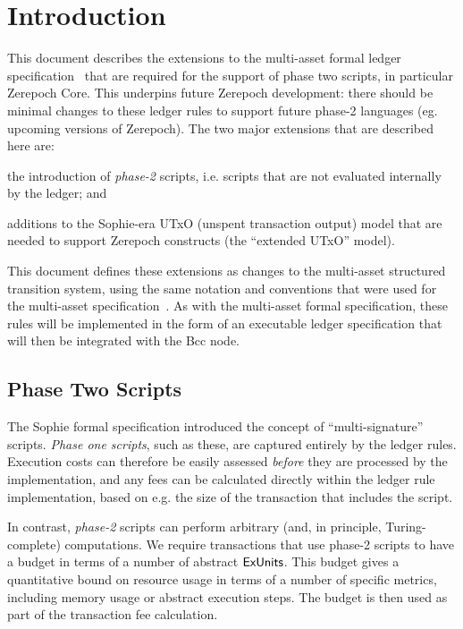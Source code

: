 \section{Introduction}

This document describes the extensions to the multi-asset formal ledger specification~\cite{sophie_ma_spec} that are
required for the support of phase two scripts, in particular Zerepoch Core. This underpins future Zerepoch development: there should be minimal changes to these ledger rules to support future phase-2 languages (eg. upcoming versions of Zerepoch).
%
The two major extensions that are described here are:

\begin{inparaenum}
\item
the introduction
of \emph{phase-2} scripts, i.e. scripts that are not evaluated internally by the ledger; and
\item
  additions to the Sophie-era UTxO (unspent transaction output) model that are needed to support Zerepoch
  constructs (the ``extended UTxO'' model).
\end{inparaenum}

This document defines these extensions as changes to the multi-asset structured transition system,
using the same notation and conventions that were used for the multi-asset specification~\cite{sophie_ma_spec}.
As with the multi-asset formal specification, these rules will be implemented in the form of an executable ledger specification that will then be
integrated with the Bcc node.

\subsection{Phase Two Scripts}

The Sophie formal specification introduced the concept of ``multi-signature'' scripts.
\emph{Phase one scripts}, such as these, are captured entirely by the ledger rules.
Execution costs can therefore be easily assessed \emph{before} they are processed by the implementation,
and any fees can be calculated directly within the ledger rule implementation,
based on e.g. the size of the transaction that includes the script.

In contrast, \emph{phase-2} scripts can perform arbitrary
(and, in principle, Turing-complete) computations.
We require transactions that use phase-2 scripts
to have a budget in terms of a number of abstract $\mathsf{ExUnits}$.
This budget gives a quantitative bound on resource usage in terms of a number of specific metrics, including memory usage or abstract execution steps.
The budget is then used as part of the transaction fee calculation.

